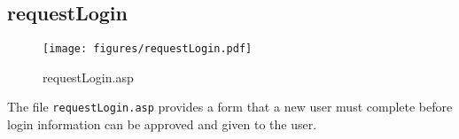 \subsection{requestLogin}
\begin{figure}[htb]
    \begin{center}
        \texttt{[image: figures/requestLogin.pdf]}
    \end{center}
    \caption{requestLogin.asp}
    \label{fig:requestLogin}
\end{figure}

The file \verb|requestLogin.asp| provides a form that a new user must complete
before login information can be approved and given to the user.
